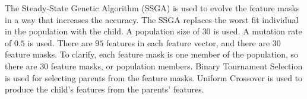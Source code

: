 \documentclass[conference]{IEEEtran}
\begin{document}
%
The Steady-State Genetic Algorithm (SSGA) is used to evolve the feature masks in a way that increases the accuracy. The SSGA replaces the worst fit individual in the population with the child. A population size of \begin{math}30\end{math} is used. A mutation rate of \begin{math}0.5\end{math} is used. There are \begin{math}95\end{math} features in each feature vector, and there are \begin{math}30\end{math} feature masks. To clarify, each feature mask is one member of the population, so there are \begin{math}30\end{math} feature masks, or population members. Binary Tournament Selection is used for selecting parents from the feature masks. Uniform Crossover is used to produce the child's features from the parents' features. %
%
%
%
%
%
%
%
%
\end{document}
